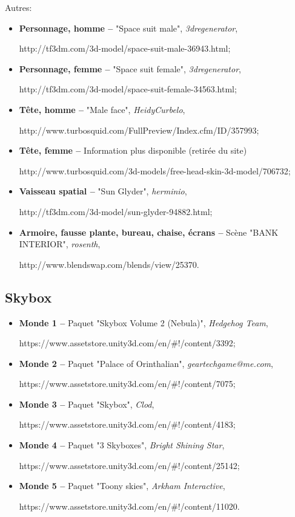 	Autres:
	\begin{itemize}
		\item \textbf{Personnage, homme --} "Space suit male", \textit{3dregenerator}, 
		
		http://tf3dm.com/3d-model/space-suit-male-36943.html;
		
		\item \textbf{Personnage, femme --} "Space suit female", \textit{3dregenerator}, 
		
		http://tf3dm.com/3d-model/space-suit-female-34563.html;
		
		\item \textbf{Tête, homme --} "Male face", \textit{HeidyCurbelo}, 
		
		http://www.turbosquid.com/FullPreview/Index.cfm/ID/357993;
		
		\item \textbf{Tête, femme --} Information plus disponible (retirée du site) 
		
		http://www.turbosquid.com/3d-models/free-head-skin-3d-model/706732;
		
		\item \textbf{Vaisseau spatial --} "Sun Glyder", \textit{herminio}, 
		
		http://tf3dm.com/3d-model/sun-glyder-94882.html;
		
		\item \textbf{Armoire, fausse plante, bureau, chaise, écrans --} Scène "BANK INTERIOR", \textit{rosenth}, 
		
		http://www.blendswap.com/blends/view/25370.
	\end{itemize}

\subsection*{Skybox}

	\begin{itemize}
		\item \textbf{Monde 1 --} Paquet "Skybox Volume 2 (Nebula)", \textit{Hedgehog Team}, 
		
		https://www.assetstore.unity3d.com/en/\#!/content/3392;
		
		\item \textbf{Monde 2 --} Paquet "Palace of Orinthalian", \textit{geartechgame@me.com}, 
		
		https://www.assetstore.unity3d.com/en/\#!/content/7075;
		
		\item \textbf{Monde 3 --} Paquet "Skybox", \textit{Clod}, 
		
		https://www.assetstore.unity3d.com/en/\#!/content/4183;
		
		\item \textbf{Monde 4 --} Paquet "3 Skyboxes", \textit{Bright Shining Star}, 
		
		https://www.assetstore.unity3d.com/en/\#!/content/25142;
		
		\item \textbf{Monde 5 --} Paquet "Toony skies", \textit{Arkham Interactive}, 
		
		https://www.assetstore.unity3d.com/en/\#!/content/11020.
	\end{itemize}
	
